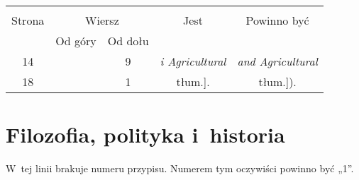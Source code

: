 \documentclass[a4paper,11pt]{article}
\begin{document}

\begin{center}

  \begin{tabular}{|c|c|c|c|c|}
    \hline
    & \multicolumn{2}{c|}{} & & \\
    Strona & \multicolumn{2}{c|}{Wiersz} & Jest
                              & Powinno być \\ \cline{2-3}
    & Od góry & Od dołu & & \\
    \hline
    14 & &  9 & \textit{i Agricultural} & \textit{and Agricultural} \\
    18 & &  1 & tłum.]. & tłum.]). \\
    \hline
  \end{tabular}

\end{center}


\vspace{\spaceTwo}










\newpage
\section{Filozofia, polityka i~historia}

\vspace{\spaceTwo}






\start {} W~tej linii brakuje numeru przypisu. Numerem tym
oczywiści powinno być „1”.

\vspace{\spaceFour}
\end{document}
